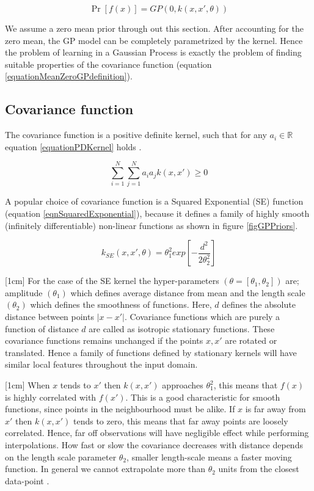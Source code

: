 \begin{equation}\label{equationMeanZeroGPdefinition}
\Pr[f(x)] = GP(0 , k(x, x', \theta))
\end{equation}

We assume a zero mean prior through out this section. After accounting for the zero mean, the GP model can be completely parametrized by the kernel. Hence the problem of learning in a Gaussian Process is exactly the problem of finding suitable properties of the covariance function \cite{rasmussen2006gaussian} (equation \ref{equationMeanZeroGPdefinition}). 


\subsection{Covariance function}\label{subSecCH2Covariance}
The covariance function is a positive definite kernel, such that for any \(a_{i} \in \mathbb{R}\) equation \ref{equationPDKernel} holds \cite{Stein1999Springer}.

\begin{equation}\label{equationPDKernel}
\sum_{i=1}^{N}\sum_{j=1}^{N}a_{i}a_{j}k(x,x') \geq 0
\end{equation}

A popular choice of covariance function is a Squared Exponential (SE) function (equation \ref{eqnSquaredExponential}), because it defines a family of highly smooth (infinitely differentiable) non-linear functions as shown in figure \ref{figGPPriors}.

\begin{equation}\label{eqnSquaredExponential}
k_{SE}(x, x', \theta) = \theta_{1}^2exp[-\frac{d^2}{2\theta_{2}^2}]
\end{equation}

[1cm]
For the case of the SE kernel the hyper-parameters \((\theta = [\theta_{1}, \theta_{2}])\) are; amplitude \((\theta_{1})\) which defines average distance from mean and the length scale \((\theta_{2})\) which defines the smoothness of functions. Here, \(d\) defines the absolute distance between points \(|x-x'|\). Covariance functions which are purely a function of distance \(d\) are called as isotropic stationary functions. These covariance functions remains unchanged if the points \(x, x'\) are rotated or translated. Hence a family of functions defined by stationary kernels will have similar local features throughout the input domain. 

[1cm]
When \(x\) tends to \(x'\) then \(k(x, x')\) approaches \(\theta_{1}^{2}\), this means that \(f(x)\) is highly correlated with \(f(x')\). This is a good characteristic for smooth functions, since points in the neighbourhood must be alike. If \(x\) is far away from  \(x'\) then \(k(x, x')\) tends to zero, this means that far away points are loosely correlated. Hence, far off observations will have negligible effect while performing interpolations. How fast or slow the covariance decreases with distance depends on the length scale parameter \(\theta_{2}\), smaller length-scale means a faster moving function. In general we cannot extrapolate more than \(\theta_{2}\) units from the closest data-point \cite{duvenaud-thesis-2014}. 

